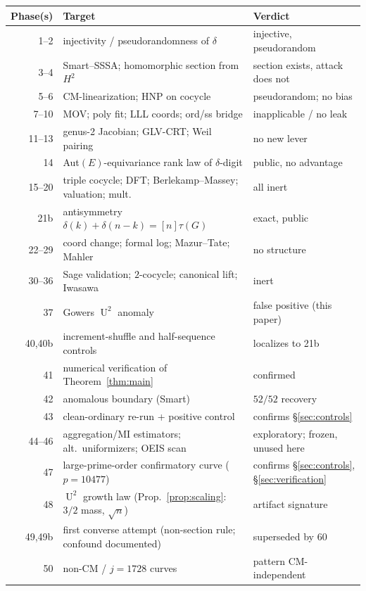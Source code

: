 \documentclass[11pt]{article}
\theoremstyle{definition}
\DeclareMathOperator{\Uk}{U}
\begin{document}
\begin{table}[H]
\centering
\small
\begin{tabular}{rll}
\toprule
Phase(s) & Target & Verdict\\
\midrule
1--2   & injectivity / pseudorandomness of $\delta$ & injective, pseudorandom\\
3--4   & Smart--SSSA; homomorphic section from $H^2$ & section exists, attack does not\\
5--6   & CM-linearization; HNP on cocycle & pseudorandom; no bias\\
7--10  & MOV; poly fit; LLL coords; ord/ss bridge & inapplicable / no leak\\
11--13 & genus-2 Jacobian; GLV-CRT; Weil pairing & no new lever\\
14     & Aut$(E)$-equivariance rank law of $\delta$-digit & public, no advantage\\
15--20 & triple cocycle; DFT; Berlekamp--Massey; valuation; mult. & all inert\\
21b    & antisymmetry $\delta(k)+\delta(n-k)=[n]\tau(G)$ & exact, public\\
22--29 & coord change; formal log; Mazur--Tate; Mahler & no structure\\
30--36 & Sage validation; $2$-cocycle; canonical lift; Iwasawa & inert\\
37     & Gowers $\Uk^2$ anomaly & false positive (this paper)\\
40,40b & increment-shuffle and half-sequence controls & localizes to 21b\\
41     & numerical verification of Theorem~\ref{thm:main} & confirmed\\
42     & anomalous boundary (Smart) & $52/52$ recovery\\
43     & clean-ordinary re-run + positive control & confirms \S\ref{sec:controls}\\
44--46 & aggregation/MI estimators; alt.\ uniformizers; OEIS scan & exploratory; frozen, unused here\\
47     & large-prime-order confirmatory curve ($p=10477$) & confirms \S\ref{sec:controls}, \S\ref{sec:verification}\\
48     & $\Uk^2$ growth law (Prop.~\ref{prop:scaling}: $3/2$ mass, $\sqrt n$) & artifact signature\\
\midrule
49,49b & first converse attempt (non-section rule; confound documented) & superseded by 60\\
50     & non-CM / $j{=}1728$ curves & pattern CM-independent\\

\end{tabular}
\end{table}
\end{document}
